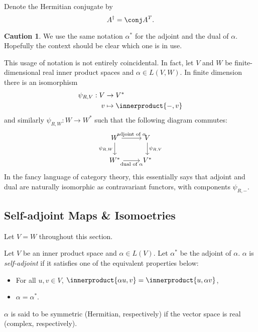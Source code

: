 \documentclass[a4paper]{article}
\newcommand*{\ip}{\innerproduct}
\theoremstyle{definition}
\newtheorem*{caution}{Caution}
\begin{document}
\begin{notation}
  Denote the Hermitian conjugate by
  \[
    A^\dag = \conj A^T.
  \]
\end{notation}

\begin{caution}
  We use the same notation \(\alpha^*\) for the adjoint and the dual of \(\alpha\). Hopefully the context should be clear which one is in use.
\end{caution}

\begin{remark}
  This usage of notation is not entirely coincidental. In fact, let \(V\) and \(W\) be finite-dimensional real inner product spaces and \(\alpha \in L(V, W)\). In finite dimension there is an isomorphism
  \begin{align*}
    \psi_{R, V}: V &\to V^* \\
    v &\mapsto \ip{-, v}
  \end{align*}
  and similarly \(\psi_{R, W}: W \to W^*\) such that the following diagram commutes:
  \[
    \begin{tikzcd}
      W \ar[r, "\text{adjoint of } \alpha"] \ar[d, "\psi_{R, W}"']  & V \ar[d, "\psi_{R, V}"] \\
      W^* \ar[r, "\text{dual of } \alpha"'] & V^*
    \end{tikzcd}
  \]
  In the fancy language of category theory, this essentially says that adjoint and dual are naturally isomorphic as contravariant functors, with components \(\psi_{R, -}\).
\end{remark}

\subsection{Self-adjoint Maps \& Isomoetries}

Let \(V = W\) throughout this section.

\begin{definition}
  Let \(V\) be an inner product space and \(\alpha \in L(V)\). Let \(\alpha^*\) be the adjoint of \(\alpha\). \(\alpha\) is \emph{self-adjoint} if it satisfies one of the equivalent properties below:
  \begin{itemize}
  \item For all \(u, v \in V\), \(\ip{\alpha u, v} = \ip{u, \alpha v}\),
  \item \(\alpha = \alpha^*\).
  \end{itemize}

  \(\alpha\) is said to be symmetric (Hermitian, respectively) if the vector space is real (complex, respectively).
\end{definition}
\end{document}
